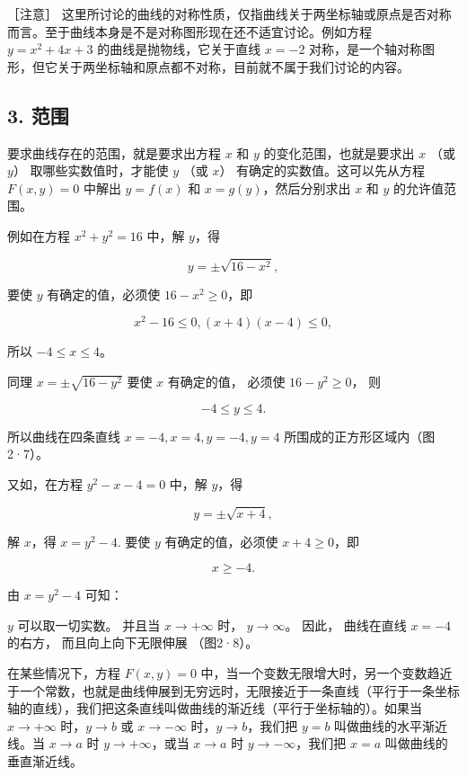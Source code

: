 ［注意］
这里所讨论的曲线的对称性质，仅指曲线关于两坐标轴或原点是否对称而言。至于曲线本身是不是对称图形现在还不适宜讨论。例如方程
\(y = x^{2} + 4x + 3\) 的曲线是抛物线，它关于直线 \(x = -2\)
对称，是一个轴对称图形，但它关于两坐标轴和原点都不对称，目前就不属于我们讨论的内容。

\subsection{3. 范围}\label{ux8303ux56f4}

要求曲线存在的范围，就是要求出方程 \(x\) 和 \(y\)
的变化范围，也就是要求出 \(x\) （或 \(y\)） 取哪些实数值时，才能使 \(y\)
（或 \(x\)） 有确定的实数值。这可以先从方程 \(F(x, y) = 0\) 中解出
\(y = f(x)\) 和 \(x = g(y)\)，然后分别求出 \(x\) 和 \(y\) 的允许值范围。

例如在方程 \(x^{2} + y^{2} = 16\) 中，解 \(y\)，得

\[
y = \pm \sqrt {16 - x^{2}},
\]

要使 \(y\) 有确定的值，必须使 \(16 - x^{2} \geqslant 0\)，即

\[
x^{2} - 16 \leqslant 0, (x + 4) (x - 4) \leqslant 0,
\]

所以 \(-4 \leqslant x \leqslant 4\)。

同理 \(x = \pm \sqrt{16 - y^2}\) 要使 \(x\) 有确定的值， 必须使
\(16 - y^{2} \geqslant 0\)， 则

\[
- 4 \leqslant y \leqslant 4.
\]

所以曲线在四条直线 \(x = -4, x = 4, y = -4, y = 4\)
所围成的正方形区域内（图2·7）。

又如，在方程 \(y^{2} - x - 4 = 0\) 中，解 \(y\)，得

\[
y = \pm \sqrt {x + 4},
\]

解 \(x\)，得 \(x = y^{2} - 4.\) 要使 \(y\) 有确定的值，必须使
\(x + 4 \geqslant 0\)，即

\[
x \geqslant - 4.
\]

由 \(x = y^{2} - 4\) 可知：

\(y\) 可以取一切实数。 并且当 \(x \to +\infty\) 时， \(y \to \infty\)。
因此， 曲线在直线 \(x = -4\) 的右方， 而且向上向下无限伸展 （图2·8）。

在某些情况下，方程 \(F(x, y) = 0\)
中，当一个变数无限增大时，另一个变数趋近于一个常数，也就是曲线伸展到无穷远时，无限接近于一条直线（平行于一条坐标轴的直线），我们把这条直线叫做曲线的渐近线（平行于坐标轴的）。如果当
\(x \to +\infty\) 时，\(y \to b\) 或 \(x \to -\infty\)
时，\(y \to b\)，我们把 \(y = b\) 叫做曲线的水平渐近线。当 \(x \to a\)
时 \(y \to +\infty\)，或当 \(x \to a\) 时 \(y \to -\infty\)，我们把
\(x = a\) 叫做曲线的垂直渐近线。

